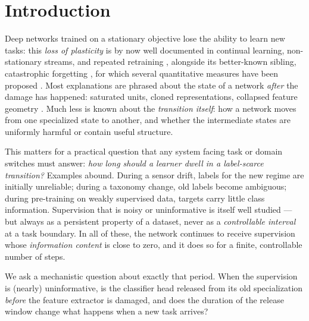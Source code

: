 \documentclass[review,12pt]{elsarticle}
\begin{document}
\section{Introduction}
\label{sec:intro}

Deep networks trained on a stationary objective \cite{goodfellow2016deep}
lose the ability to learn new tasks: this \emph{loss of plasticity} is by now
well documented in continual learning, non-stationary streams, and repeated
retraining \cite{joudaki2026barriers,kumar2022loss}, alongside its better-known
sibling, catastrophic forgetting
\cite{kirkpatrick2017ewc,lopezpaz2017gem,rebuffi2017icarl,delange2021survey,masana2022survey},
for which several quantitative measures have been proposed
\cite{pariszi2019review,kemker2018measures,zenke2017continual}. Most
explanations are phrased about the state of a network \emph{after} the damage
has happened: saturated units, cloned representations, collapsed feature
geometry \cite{joudaki2026barriers,papyan2020prevalence}. Much less is known
about the \emph{transition itself}: how a network moves from one specialized
state to another, and whether the intermediate states are uniformly harmful or
contain useful structure.

This matters for a practical question that any system facing task or domain
switches must answer: \emph{how long should a learner dwell in a
label-scarce transition?} Examples abound. During a sensor drift, labels for
the new regime are initially unreliable; during a taxonomy change, old labels
become ambiguous; during pre-training on weakly supervised data, targets carry
little class information. Supervision that is noisy or uninformative is itself
well studied \cite{rolnick2018learning,patrini2017making,meister2020generalized}
--- but always as a persistent property of a dataset, never as a
\emph{controllable interval} at a task boundary. In all of these, the network
continues to receive supervision whose \emph{information content} is close to
zero, and it does so for a finite, controllable number of steps.

We ask a mechanistic question about exactly that period. When the supervision
is (nearly) uninformative, is the classifier head released from its old
specialization \emph{before} the feature extractor is damaged, and does the
duration of the release window change what happens when a new task arrives?
\end{document}
